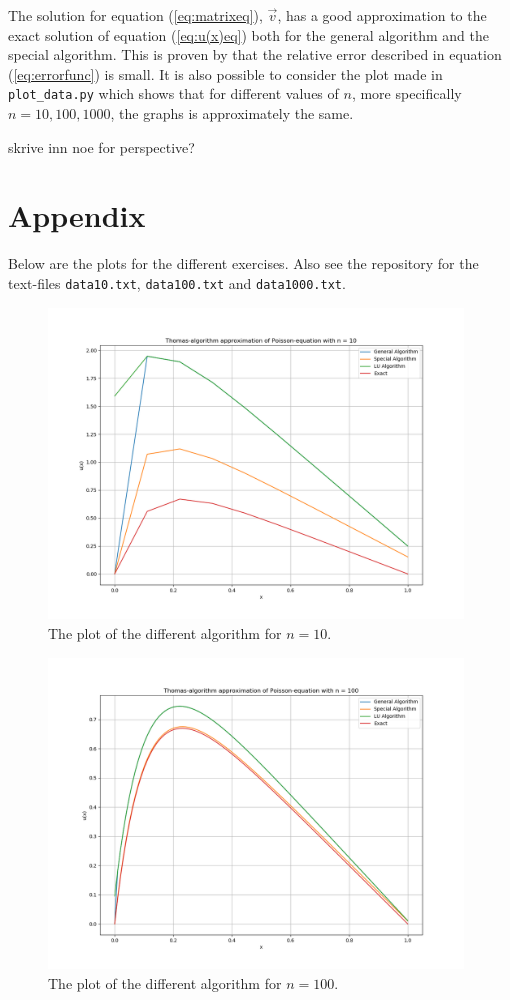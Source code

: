 \documentclass{article}
\begin{document}
  The solution for equation (\ref{eq:matrixeq}), $\vec{v}$, has a good approximation to the exact solution of equation (\ref{eq:u(x)eq}) both for the general algorithm and the special algorithm. This is proven by that the relative error described in equation (\ref{eq:errorfunc}) is small. It is also possible to consider the plot made in \texttt{plot\_data.py} which shows that for different values of $n$, more specifically $n = 10, 100, 1000$, the graphs is approximately the same.

  {\large skrive inn noe for perspective? }


\vspace{1cm}

\section{Appendix} \label{Appendix}

Below are the plots for the different exercises. Also see the repository for the text-files \texttt{data10.txt}, \texttt{data100.txt} and \texttt{data1000.txt}.


\begin{figure}[ht]
	\centering
	\includegraphics[width = 11cm]{program/data10.png}
	\caption{The plot of the different algorithm for $n = 10$. }
  \label{fig:data10png}
\end{figure}

\begin{figure}[ht]
	\centering
	\includegraphics[width = 11cm]{program/data100.png}
	\caption{The plot of the different algorithm for $n = 100$. }
  \label{fig:data100png}
\end{figure}
\end{document}
